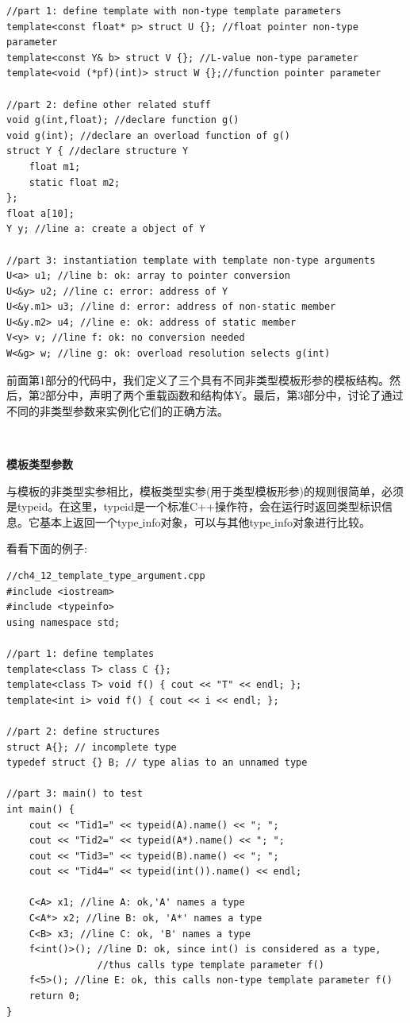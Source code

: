 \begin{lstlisting}[caption={}]
//part 1: define template with non-type template parameters
template<const float* p> struct U {}; //float pointer non-type parameter
template<const Y& b> struct V {}; //L-value non-type parameter
template<void (*pf)(int)> struct W {};//function pointer parameter

//part 2: define other related stuff
void g(int,float); //declare function g()
void g(int); //declare an overload function of g()
struct Y { //declare structure Y
	float m1;
	static float m2;
};
float a[10];
Y y; //line a: create a object of Y

//part 3: instantiation template with template non-type arguments
U<a> u1; //line b: ok: array to pointer conversion
U<&y> u2; //line c: error: address of Y
U<&y.m1> u3; //line d: error: address of non-static member
U<&y.m2> u4; //line e: ok: address of static member
V<y> v; //line f: ok: no conversion needed
W<&g> w; //line g: ok: overload resolution selects g(int)
\end{lstlisting}

前面第1部分的代码中，我们定义了三个具有不同非类型模板形参的模板结构。然后，第2部分中，声明了两个重载函数和结构体Y。最后，第3部分中，讨论了通过不同的非类型参数来实例化它们的正确方法。\par

\noindent\textbf{}\ \par
\textbf{模板类型参数} \ \par
与模板的非类型实参相比，模板类型实参(用于类型模板形参)的规则很简单，必须是typeid。在这里，typeid是一个标准C++操作符，会在运行时返回类型标识信息。它基本上返回一个type\underline{ }info对象，可以与其他type\underline{ }info对象进行比较。 \par
看看下面的例子: \par

\begin{lstlisting}[caption={}]
//ch4_12_template_type_argument.cpp
#include <iostream>
#include <typeinfo>
using namespace std;

//part 1: define templates
template<class T> class C {};
template<class T> void f() { cout << "T" << endl; };
template<int i> void f() { cout << i << endl; };

//part 2: define structures
struct A{}; // incomplete type
typedef struct {} B; // type alias to an unnamed type

//part 3: main() to test
int main() {
	cout << "Tid1=" << typeid(A).name() << "; ";
	cout << "Tid2=" << typeid(A*).name() << "; ";
	cout << "Tid3=" << typeid(B).name() << "; ";
	cout << "Tid4=" << typeid(int()).name() << endl;
	
	C<A> x1; //line A: ok,'A' names a type
	C<A*> x2; //line B: ok, 'A*' names a type
	C<B> x3; //line C: ok, 'B' names a type
	f<int()>(); //line D: ok, since int() is considered as a type,
				//thus calls type template parameter f()
	f<5>(); //line E: ok, this calls non-type template parameter f()
	return 0;
}
\end{lstlisting}

